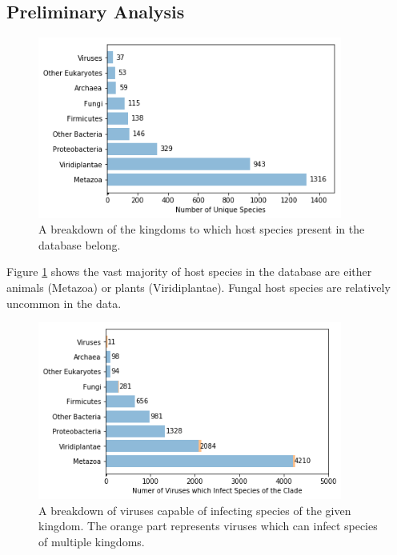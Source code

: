 \documentclass[12pt]{article}
\begin{document}
    \subsection{Preliminary Analysis}

    \begin{figure}[H]
        \begin{center}
            \includegraphics[width=100mm]{host_clades_figure.png}
            \caption{A breakdown of the kingdoms to which host species present in
            the database belong.}
            \label{host_clades_figure}
        \end{center}
    \end{figure}

    Figure \ref{host_clades_figure} shows the vast majority of host species in
    the database are either animals (Metazoa) or plants (Viridiplantae). Fungal
    host species are relatively uncommon in the data.

    \begin{figure}[H]
        \begin{center}
            \includegraphics[width=100mm]{infects_clades_figure.png}
            \caption{A breakdown of viruses capable of infecting species of
            the given kingdom. The orange part represents viruses which can
            infect species of multiple kingdoms.}
            \label{infects_clades_figure}
        \end{center}
    \end{figure}
\end{document}
